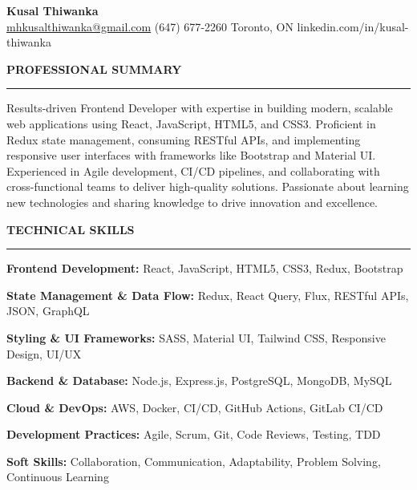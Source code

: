 \documentclass[10pt,letterpaper]{article}
\begin{document}
\begin{center}
{\LARGE\textbf{Kusal Thiwanka}}\\[3pt]
\href{mailto:mhkusalthiwanka@gmail.com}{mhkusalthiwanka@gmail.com}\hspace{2em}%
(647) 677{-}2260\hspace{2em}%
Toronto, ON\hspace{2em}
linkedin.com/in/kusal-thiwanka
\end{center}

\vspace{6pt}

\textbf{PROFESSIONAL SUMMARY}\\[-8pt]
\noindent\rule{\textwidth}{1pt}

\vspace{-2pt}

Results-driven Frontend Developer with expertise in building modern, scalable web applications using React, JavaScript, HTML5, and CSS3. Proficient in Redux state management, consuming RESTful APIs, and implementing responsive user interfaces with frameworks like Bootstrap and Material UI. Experienced in Agile development, CI/CD pipelines, and collaborating with cross-functional teams to deliver high-quality solutions. Passionate about learning new technologies and sharing knowledge to drive innovation and excellence.

\vspace{8pt}

\textbf{TECHNICAL SKILLS}\\[-8pt]
\noindent\rule{\textwidth}{1pt}

\vspace{-2pt}

\textbf{Frontend Development:} React, JavaScript, HTML5, CSS3, Redux, Bootstrap

\textbf{State Management \& Data Flow:} Redux, React Query, Flux, RESTful APIs, JSON, GraphQL

\textbf{Styling \& UI Frameworks:} SASS, Material UI, Tailwind CSS, Responsive Design, UI/UX

\textbf{Backend \& Database:} Node.js, Express.js, PostgreSQL, MongoDB, MySQL

\textbf{Cloud \& DevOps:} AWS, Docker, CI/CD, GitHub Actions, GitLab CI/CD

\textbf{Development Practices:} Agile, Scrum, Git, Code Reviews, Testing, TDD

\textbf{Soft Skills:} Collaboration, Communication, Adaptability, Problem Solving, Continuous Learning
\end{document}
